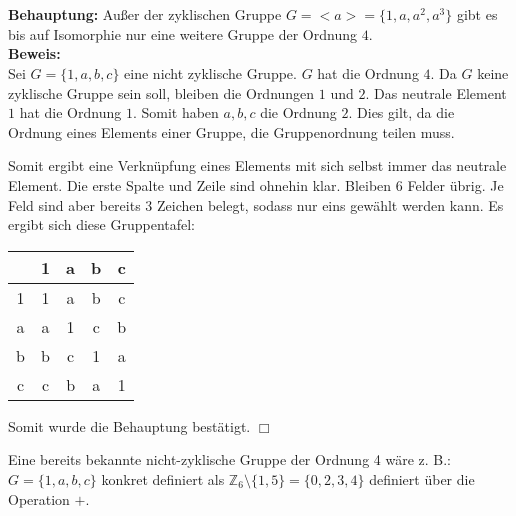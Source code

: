 \documentclass[10pt,a4paper,oneside,ngerman,numbers=noenddot]{scrartcl}
\begin{document}
\section{} %
\textbf{Behauptung:} Außer der zyklischen Gruppe $G = <a> = \{1,a,a^{2},a^{3}\}$ gibt es bis auf Isomorphie nur eine weitere Gruppe der Ordnung $4$.\\
\textbf{Beweis:}\\
Sei $G = \{1,a,b,c\}$ eine nicht zyklische Gruppe. $G$ hat die Ordnung $4$. Da $G$ keine zyklische Gruppe sein soll, bleiben die Ordnungen $1$ und $2$. Das neutrale Element $1$ hat die Ordnung $1$. Somit haben $a,b,c$ die Ordnung $2$. Dies gilt, da die Ordnung eines Elements einer Gruppe, die Gruppenordnung teilen muss.

Somit ergibt eine Verknüpfung eines Elements mit sich selbst immer das neutrale Element. Die erste Spalte und Zeile sind ohnehin klar. Bleiben $6$ Felder übrig. Je Feld sind aber bereits $3$ Zeichen belegt, sodass nur eins gewählt werden kann. Es ergibt sich diese Gruppentafel:

\begin{tabular}{c||c|c|c|c}
  & 1 & a & b & c \\
\hline
\hline
1 & 1 & a & b & c \\
\hline
a & a & 1 & c & b \\
\hline
b & b & c & 1 & a \\
\hline
c & c & b & a & 1
\end{tabular}

Somit wurde die Behauptung bestätigt. \hfill $\Box$

Eine bereits bekannte nicht-zyklische Gruppe der Ordnung 4 wäre z. B.: $G = \{1,a,b,c\}$ konkret definiert als $\mathbb{Z}_{6} \setminus \{1,5\} = \{0,2,3,4\}$ definiert über die Operation $+$.
\end{document}
